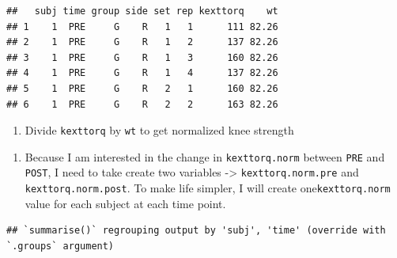 \documentclass[
]{book}
\newenvironment{Shaded}{\begin{snugshade}}{\end{snugshade}}
\newcommand{\DataTypeTok}[1]{\textcolor[rgb]{0.13,0.29,0.53}{#1}}
\newcommand{\KeywordTok}[1]{\textcolor[rgb]{0.13,0.29,0.53}{\textbf{#1}}}
\newcommand{\NormalTok}[1]{#1}
\newcommand{\OperatorTok}[1]{\textcolor[rgb]{0.81,0.36,0.00}{\textbf{#1}}}
\newcommand{\StringTok}[1]{\textcolor[rgb]{0.31,0.60,0.02}{#1}}
\providecommand{\tightlist}{%
  \setlength{\itemsep}{0pt}\setlength{\parskip}{0pt}}
\begin{document}
\begin{verbatim}
##   subj time group side set rep kexttorq    wt
## 1    1  PRE     G    R   1   1      111 82.26
## 2    1  PRE     G    R   1   2      137 82.26
## 3    1  PRE     G    R   1   3      160 82.26
## 4    1  PRE     G    R   1   4      137 82.26
## 5    1  PRE     G    R   2   1      160 82.26
## 6    1  PRE     G    R   2   2      163 82.26
\end{verbatim}

\begin{enumerate}
\def\labelenumi{\arabic{enumi}.}
\setcounter{enumi}{3}
\tightlist
\item
  Divide \texttt{kexttorq} by \texttt{wt} to get normalized knee strength
\end{enumerate}

\begin{Shaded}
\end{Shaded}

\begin{enumerate}
\def\labelenumi{\arabic{enumi}.}
\setcounter{enumi}{4}
\tightlist
\item
  Because I am interested in the change in \texttt{kexttorq.norm} between \texttt{PRE} and \texttt{POST}, I need to take create two variables -\textgreater{} \texttt{kexttorq.norm.pre} and \texttt{kexttorq.norm.post}. To make life simpler, I will create one\texttt{kexttorq.norm} value for each subject at each time point.
\end{enumerate}

\begin{Shaded}
\end{Shaded}

\begin{verbatim}
## `summarise()` regrouping output by 'subj', 'time' (override with `.groups` argument)
\end{verbatim}
\end{document}

